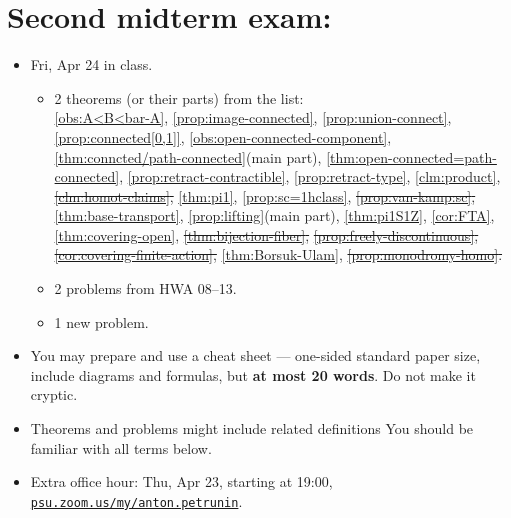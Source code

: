 \section*{Second midterm exam: }\label{MT2}
\begin{itemize}
\item Fri, Apr 24 in class.
\begin{itemize}
\item 2 theorems (or their parts) from the list:
\\
\ref{obs:A<B<bar-A}, \ref{prop:image-connected}, \ref{prop:union-connect}, \ref{prop:connected[0,1]}, \ref{obs:open-connected-component}, \ref{thm:conncted/path-connected}(main part), \ref{thm:open-connected=path-connected}, \ref{prop:retract-contractible}, \ref{prop:retract-type},
\ref{clm:product}, \sout{\ref{clm:homot-claims},} \ref{thm:pi1}, \ref{prop:sc=1hclass}, \sout{\ref{prop:van-kamp:sc},}
\ref{thm:base-transport},
\ref{prop:lifting}(main part), \ref{thm:pi1S1Z}, \ref{cor:FTA},
\ref{thm:covering-open},
\sout{\ref{thm:bijection-fiber},}
\sout{\ref{prop:freely-discontinuous},} \sout{\ref{cor:covering-finite-action},} \ref{thm:Borsuk-Ulam}, \sout{\ref{prop:monodromy-homo}.}
\item 2 problems from HWA 08--13.
\item 1 new problem.
\end{itemize}
\item You may prepare and use a cheat sheet --- one-sided standard paper size, include diagrams and formulas, but \textbf{at most 20 words}. Do not make it cryptic.
\item Theorems and problems might include related definitions
You should be familiar with all terms below.
\item Extra office hour: Thu, Apr 23, starting at 19:00,\\ \href{https://psu.zoom.us/my/anton.petrunin}{\texttt{psu.zoom.us/my/anton.petrunin}}.
\end{itemize}

